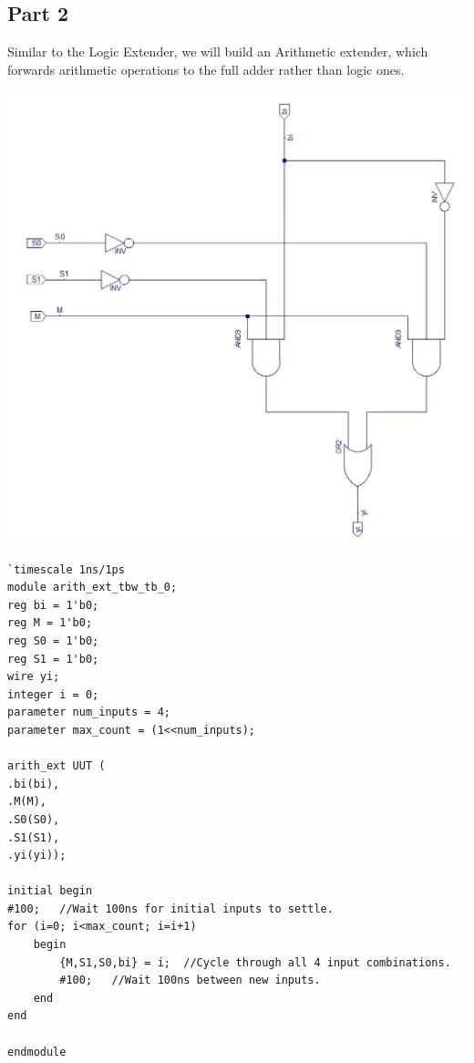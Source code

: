\documentclass[12pt]{article}
\begin{document}
	
	\subsection{Part 2}
		Similar to the Logic Extender, we will build an Arithmetic extender, which forwards arithmetic operations to the full adder rather than logic ones.
		
		\begin{center}
			\includegraphics[scale=.5]{arith_ext_sch.png}
		\end{center}

		\begin{Verbatim}[frame=single, fontsize=\small]
`timescale 1ns/1ps 
module arith_ext_tbw_tb_0;     
reg bi = 1'b0;     
reg M = 1'b0;     
reg S0 = 1'b0;     
reg S1 = 1'b0;     
wire yi;     
integer i = 0;    
parameter num_inputs = 4;     
parameter max_count = (1<<num_inputs); 
 
arith_ext UUT (     
.bi(bi),     
.M(M),     
.S0(S0),     
.S1(S1),     
.yi(yi)); 
  
initial begin     
#100;   //Wait 100ns for initial inputs to settle.      
for (i=0; i<max_count; i=i+1)           
	begin             
		{M,S1,S0,bi} = i;  //Cycle through all 4 input combinations.             
		#100;   //Wait 100ns between new inputs.         
	end 
end 
 
endmodule 
			
		\end{Verbatim}
\end{document}
